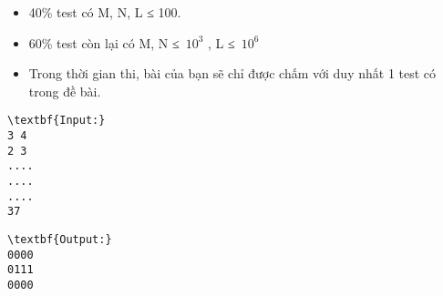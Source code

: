 \begin{itemize}
	\item 40\% test có M, N, L ≤ 100.
	\item 60\% test còn lại có M, N ≤ $10^{3}$ , L ≤ $10^{6}$
\end{itemize}
\begin{itemize}
	\item Trong thời gian thi, bài của bạn sẽ chỉ được chấm với duy nhất 1 test có trong đề bài.
\end{itemize}
\begin{verbatim}
\textbf{Input:}
3 4
2 3
....
....
....
37\end{verbatim}
\begin{verbatim}
\textbf{Output:}
0000
0111
0000
\end{verbatim}